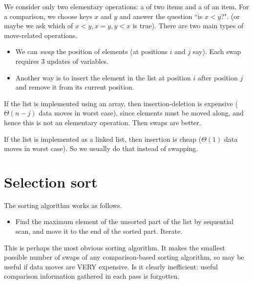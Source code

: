 
We consider only two elementary operations: a  of two items and a  of an item.
For a comparison, we choose keys $x$ and $y$ and answer the question ``is $x<y$?". (or maybe we ask which of $x<y, x=y, y<x$ is true). 
There are two main types of move-related operations. 
\begin{itemize}
\item We can \emph{swap} the position of elements (at positions $i$ and $j$ say). 
Each swap requires 3 updates of variables.
\item Another way is to insert the element in the list at position $i$ after position $j$ and remove it from its current position.
\end{itemize}

If the list is implemented using an array, then insertion-deletion is expensive ($\Theta(n-j)$ data moves in worst case), 
since elements must be moved along, and hence this is not an elementary operation. Then swaps are better.

If the list is implemented as a linked list, then insertion is cheap ($\Theta(1)$ data moves in worst case).
So we usually do that instead of swapping.
	
\section{Selection sort} %
\label{sec:selectionsort}
The sorting algorithm  works as follows.
\begin{itemize} 
	\item Find the maximum element of the unsorted part of the list by sequential 
	scan, and move it to the end of the sorted part. Iterate.
	\end{itemize}
This is perhaps the most obvious sorting algorithm.
It makes the smallest possible number of swaps of any comparison-based sorting algorithm, 
	so may be useful if data moves are VERY expensive.
Is it clearly inefficient: useful comparison information gathered in each 
	pass is forgotten.


